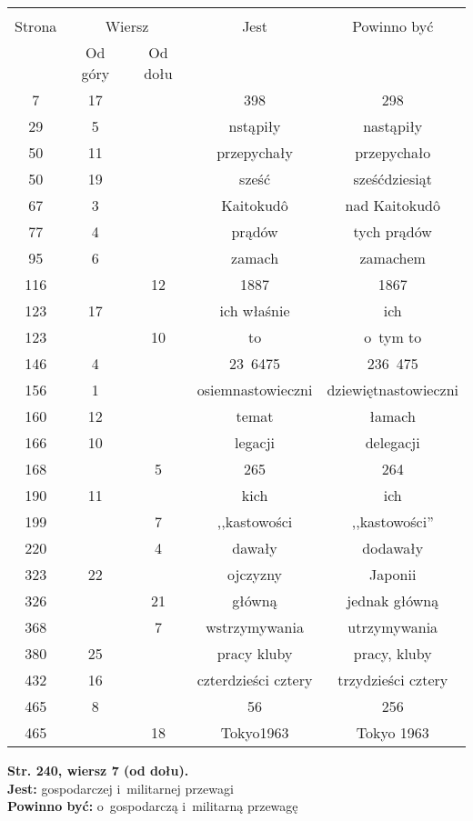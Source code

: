 \documentclass[a4paper,11pt]{article}
\newcommand{\tb}{\textbf}
\newcommand{\noi}{\noindent}
\newcommand{\StrWd}[2]{\tb{Str. #1, wiersz #2 (od dołu).}}
\newcommand{\Jest}{\tb{Jest: }}
\newcommand{\Pow}{\tb{Powinno być: }}
\begin{document}
\begin{center}
  \begin{tabular}{|c|c|c|c|c|}
    \hline
    & \multicolumn{2}{c|}{} & & \\
    Strona & \multicolumn{2}{c|}{Wiersz}& Jest & Powinno być \\ \cline{2-3}
    & Od góry & Od dołu &  &  \\ \hline
    7   & 17 & & 398 & 298 \\
    29  &  5 & & nstąpiły & nastąpiły \\
    50  & 11 & & przepychały & przepychało \\
    50  & 19 & & sześć & sześćdziesiąt \\
    67  &  3 & & Kaitokud\^{o} & nad Kaitokud\^{o} \\
    77  &  4 & & prądów & tych prądów \\
    95  &  6 & & zamach & zamachem \\
    116 & & 12 & 1887 & 1867 \\
    123 & 17 & & ich właśnie & ich \\
    123 & & 10 & to & o~tym to \\
    146 &  4 & & 23~6475 & 236~475 \\
    156 &  1 & & osiemnastowieczni & dziewiętnastowieczni \\
    160 & 12 & & temat & łamach \\
    166 & 10 & & legacji & delegacji \\
    168 & & 5 & 265 & 264 \\
    190 & 11 & & kich & ich \\
    199 & & 7 & ,,kastowości %
           & ,,kastowości'' \\
    220 & & 4 & dawały & dodawały \\
    323 & 22 & & ojczyzny & Japonii \\
    326 & & 21 & główną & jednak główną \\
    368 & &  7 & wstrzymywania & utrzymywania \\
    380 & 25 & & pracy kluby & pracy, kluby \\
    432 & 16 & & czterdzieści cztery & trzydzieści cztery \\
    465 &  8 & & 56 & 256 \\
    465 & & 18 & Tokyo1963 & Tokyo 1963 \\
    \hline
  \end{tabular}
\end{center}
\noi
\StrWd{240}{7} \\
\Jest gospodarczej i~militarnej przewagi \\
\Pow  o~gospodarczą i~militarną przewagę \\
\end{document}
